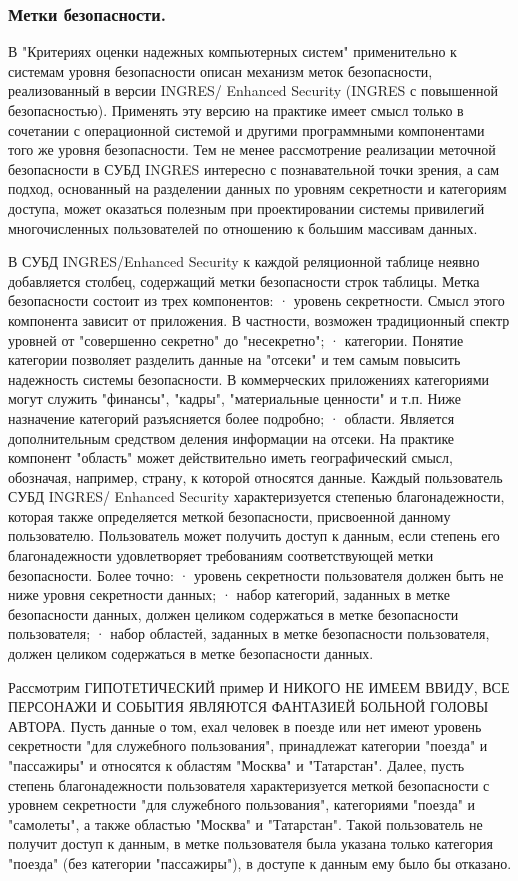 \subsubsection{ Метки безопасности.}


В "Критериях оценки надежных компьютерных систем" применительно к системам уровня безопасности описан механизм меток безопасности, реализованный в версии INGRES/ Enhanced Security (INGRES с повышенной безопасностью). Применять эту версию на практике имеет смысл только в сочетании с операционной системой и другими программными компонентами того же уровня безопасности. Тем не менее рассмотрение реализации меточной безопасности в СУБД INGRES интересно с познавательной точки зрения, а сам подход, основанный на разделении данных по уровням секретности и категориям доступа, может оказаться полезным при проектировании системы привилегий многочисленных пользователей по отношению к большим массивам данных.

В СУБД INGRES/Enhanced Security к каждой реляционной таблице неявно добавляется столбец, содержащий метки безопасности строк таблицы. Метка безопасности состоит из трех компонентов:
· уровень секретности. Смысл этого компонента зависит от приложения. В частности, возможен традиционный спектр уровней от "совершенно секретно" до "несекретно";
· категории. Понятие категории позволяет разделить данные на "отсеки" и тем самым повысить надежность системы безопасности. В коммерческих приложениях категориями могут служить "финансы", "кадры", "материальные ценности" и т.п. Ниже назначение категорий разъясняется более подробно;
· области. Является дополнительным средством деления информации на отсеки. На практике компонент "область" может действительно иметь географический смысл, обозначая, например, страну, к которой относятся данные.
Каждый пользователь СУБД INGRES/ Enhanced Security характеризуется степенью благонадежности, которая также определяется меткой безопасности, присвоенной данному пользователю. Пользователь может получить доступ к данным, если степень его благонадежности удовлетворяет требованиям соответствующей метки безопасности. Более точно:
· уровень секретности пользователя должен быть не ниже уровня секретности данных;
· набор категорий, заданных в метке безопасности данных, должен целиком содержаться в метке безопасности пользователя;
· набор областей, заданных в метке безопасности пользователя, должен целиком содержаться в метке безопасности данных.

Рассмотрим ГИПОТЕТИЧЕСКИЙ пример И НИКОГО НЕ ИМЕЕМ ВВИДУ, ВСЕ ПЕРСОНАЖИ И СОБЫТИЯ ЯВЛЯЮТСЯ ФАНТАЗИЕЙ БОЛЬНОЙ ГОЛОВЫ АВТОРА. Пусть данные о том, ехал человек в поезде или нет имеют уровень секретности "для служебного пользования", принадлежат категории "поезда" и "пассажиры" и относятся к областям "Москва" и "Татарстан". Далее, пусть степень благонадежности пользователя характеризуется меткой безопасности с уровнем секретности "для служебного пользования", категориями "поезда" и "самолеты", а также областью "Москва" и "Татарстан". Такой пользователь не получит доступ к данным, в метке пользователя была указана только категория "поезда" (без категории "пассажиры"), в доступе к данным ему было бы отказано.

